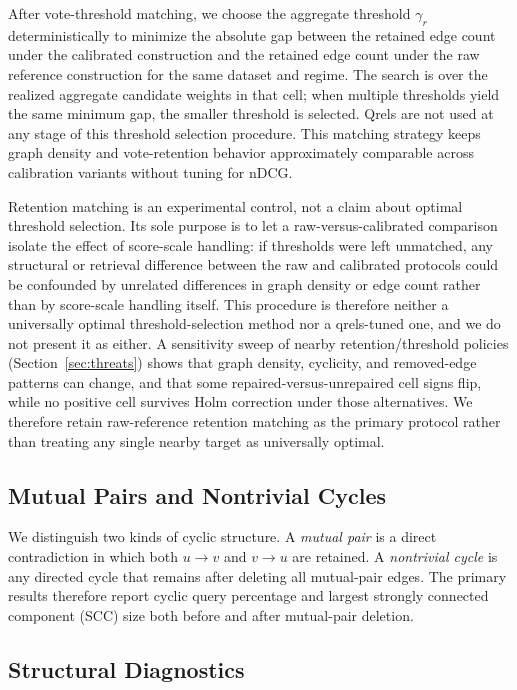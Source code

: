 \documentclass[manuscript,anonymous,review]{acmart}
\begin{document}
After vote-threshold matching, we choose the aggregate threshold $\gamma_r$
deterministically to minimize the absolute gap between the retained edge count
under the calibrated construction and the retained edge count under the raw
reference construction for the same dataset and regime. The search is over the
realized aggregate candidate weights in that cell; when multiple thresholds
yield the same minimum gap, the smaller threshold is selected. Qrels are not
used at any stage of this threshold selection procedure. This matching
strategy keeps graph density and vote-retention behavior approximately
comparable across calibration variants without tuning for nDCG.

Retention matching is an experimental control, not a claim about optimal
threshold selection. Its sole purpose is to let a raw-versus-calibrated
comparison isolate the effect of score-scale handling: if thresholds were left
unmatched, any structural or retrieval difference between the raw and
calibrated protocols could be confounded by unrelated differences in graph
density or edge count rather than by score-scale handling itself. This
procedure is therefore neither a universally optimal threshold-selection
method nor a qrels-tuned one, and we do not present it as either. A sensitivity
sweep of nearby retention/threshold policies (Section~\ref{sec:threats}) shows that
graph density, cyclicity, and removed-edge patterns can change, and that some
repaired-versus-unrepaired cell signs flip, while no positive cell survives Holm
correction under those alternatives. We therefore retain raw-reference retention
matching as the primary protocol rather than treating any single nearby target as
universally optimal.

\subsection{Mutual Pairs and Nontrivial Cycles}

We distinguish two kinds of cyclic structure. A \emph{mutual pair} is a direct
contradiction in which both $u \rightarrow v$ and $v \rightarrow u$ are
retained. A \emph{nontrivial cycle} is any directed cycle that remains after
deleting all mutual-pair edges. The primary results therefore report cyclic
query percentage and largest strongly connected component (SCC) size both
before and after mutual-pair deletion.

\subsection{Structural Diagnostics}
\label{sec:structural-metrics}
\end{document}
